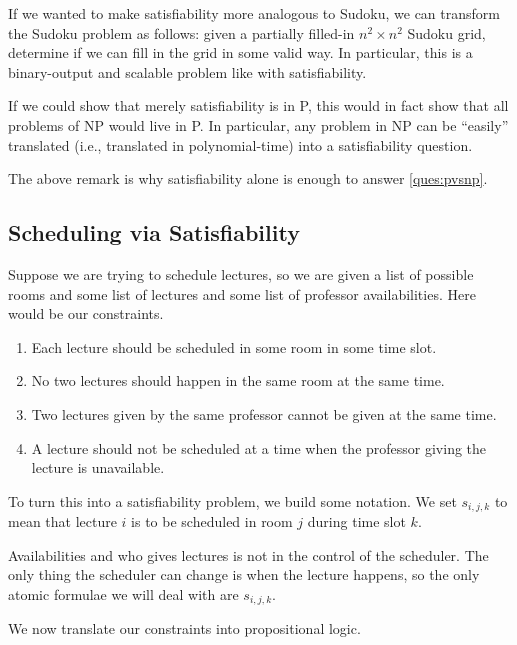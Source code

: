 If we wanted to make satisfiability more analogous to Sudoku, we can transform the Sudoku problem as follows: given a partially filled-in $n^2\times n^2$ Sudoku grid, determine if we can fill in the grid in some valid way. In particular, this is a binary-output and scalable problem like with satisfiability.
\begin{remark}
	If we could show that merely satisfiability is in P, this would in fact show that all problems of NP would live in P. In particular, any problem in NP can be ``easily'' translated (i.e., translated in polynomial-time) into a satisfiability question.
\end{remark}
The above remark is why satisfiability alone is enough to answer \autoref{ques:pvsnp}.

\subsection{Scheduling via Satisfiability}
Suppose we are trying to schedule lectures, so we are given a list of possible rooms and some list of lectures and some list of professor availabilities. Here would be our constraints.
\begin{enumerate}
	\item Each lecture should be scheduled in some room in some time slot.
	\item No two lectures should happen in the same room at the same time.
	\item Two lectures given by the same professor cannot be given at the same time.
	\item A lecture should not be scheduled at a time when the professor giving the lecture is unavailable.
\end{enumerate}
To turn this into a satisfiability problem, we build some notation. We set $s_{i,j,k}$ to mean that lecture $i$ is to be scheduled in room $j$ during time slot $k$.
\begin{remark}
	Availabilities and who gives lectures is not in the control of the scheduler. The only thing the scheduler can change is when the lecture happens, so the only atomic formulae we will deal with are $s_{i,j,k}$.
\end{remark}
We now translate our constraints into propositional logic.
